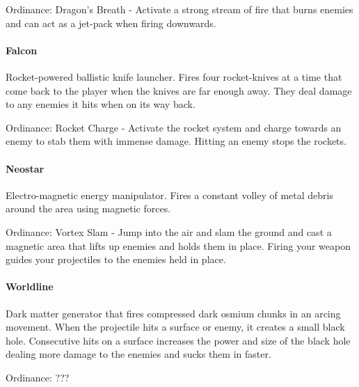 \documentclass[../Main.tex]{subfiles}
\begin{document}
Ordinance: Dragon's Breath - Activate a strong stream of fire that burns enemies and can act as a jet-pack when firing downwards.

\paragraph{Falcon}

Rocket-powered ballistic knife launcher. Fires four rocket-knives at a time that come back to the player when the knives are far enough away. They deal damage to any enemies it hits when on its way back.

Ordinance: Rocket Charge - Activate the rocket system and charge towards an enemy to stab them with immense damage. Hitting an enemy stops the rockets. 

\paragraph{Neostar}

Electro-magnetic energy manipulator. Fires a constant volley of metal debris around the area using magnetic forces.

Ordinance: Vortex Slam - Jump into the air and slam the ground and cast a magnetic area that lifts up enemies and holds them in place. Firing your weapon guides your projectiles to the enemies held in place.

\paragraph{Worldline}

Dark matter generator that fires compressed dark osmium chunks in an arcing movement. When the projectile hits a surface or enemy, it creates a small black hole. Consecutive hits on a surface increases the power and size of the black hole dealing more damage to the enemies and sucks them in faster. 

Ordinance: ???
\end{document}

